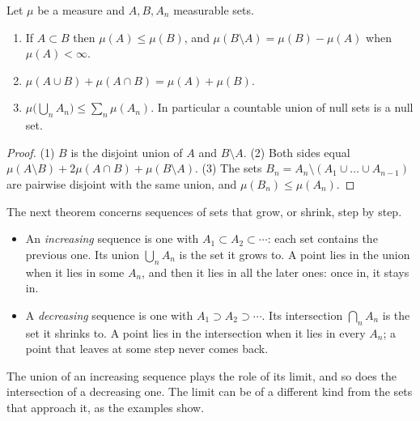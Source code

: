 \begin{notechapter}
\begin{proposition}\label{measures:prop:basic}
Let $\mu$ be a measure and $A, B, A_n$ measurable sets.
\begin{enumerate}[nosep]
  \item If $A\subset B$ then $\mu(A)\leq\mu(B)$, and
        $\mu(B\setminus A) = \mu(B) - \mu(A)$ when $\mu(A) < \infty$.
  \item $\mu(A\cup B) + \mu(A\cap B) = \mu(A) + \mu(B)$.
  \item $\mu\bigl(\bigcup_nA_n\bigr)\leq\sum_n\mu(A_n)$. In particular a
        countable union of null sets is a null set.
\end{enumerate}
\end{proposition}

\begin{proof}
(1) $B$ is the disjoint union of $A$ and $B\setminus A$. (2) Both sides
equal $\mu(A\setminus B) + 2\mu(A\cap B) + \mu(B\setminus A)$. (3) The
sets $B_n = A_n\setminus(A_1\cup\dots\cup A_{n-1})$ are pairwise
disjoint with the same union, and $\mu(B_n)\leq\mu(A_n)$.
\end{proof}

The next theorem concerns sequences of sets that grow, or shrink, step
by step.
\begin{itemize}[nosep]
  \item An \emph{increasing} sequence is one with
        $A_1\subset A_2\subset\cdots$: each set contains the previous
        one. Its union $\bigcup_nA_n$ is the set it grows to. A point
        lies in the union when it lies in some $A_n$, and then it lies
        in all the later ones: once in, it stays in.
  \item A \emph{decreasing} sequence is one with
        $A_1\supset A_2\supset\cdots$. Its intersection $\bigcap_nA_n$
        is the set it shrinks to. A point lies in the intersection when
        it lies in every $A_n$; a point that leaves at some step never
        comes back.
\end{itemize}
The union of an increasing sequence plays the role of its limit, and so
does the intersection of a decreasing one. The limit can be of a
different kind from the sets that approach it, as the examples show.


\end{notechapter}
